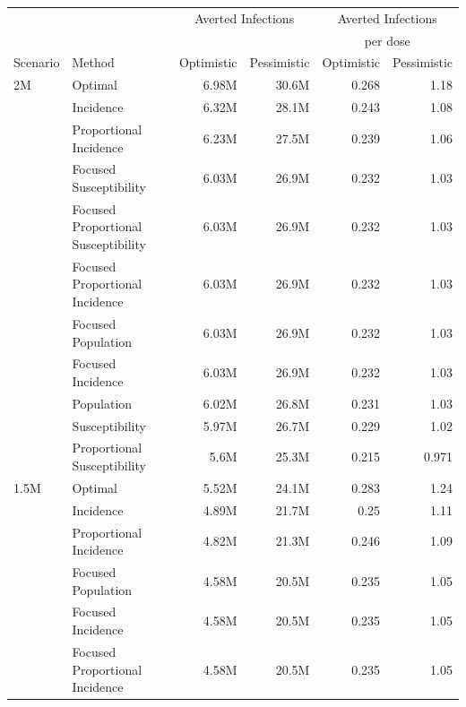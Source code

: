 \begin{table}[h!]
\centering
\tiny
\begin{tabular}{llrrrr}
\toprule
& {} & \multicolumn{2}{c}{Averted Infections} & \multicolumn{2}{c}{Averted Infections} \\
&    &  & & \multicolumn{2}{c}{per dose} \\
Scenario & Method &  Optimistic & Pessimistic &     Optimistic & Pessimistic          \\
\midrule
2M & Optimal &   6.98M &    30.6M &          0.268 &        1.18 \\
        & Incidence &   6.32M &    28.1M &          0.243 &        1.08 \\
        & Proportional Incidence &   6.23M &    27.5M &          0.239 &        1.06 \\
        & Focused Susceptibility &   6.03M &    26.9M &          0.232 &        1.03 \\
        & Focused Proportional Susceptibility &   6.03M &    26.9M &          0.232 &        1.03 \\
        & Focused Proportional Incidence &   6.03M &    26.9M &          0.232 &        1.03 \\
        & Focused Population &   6.03M &    26.9M &          0.232 &        1.03 \\
        & Focused Incidence &   6.03M &    26.9M &          0.232 &        1.03 \\
        & Population &   6.02M &    26.8M &          0.231 &        1.03 \\
        & Susceptibility &   5.97M &    26.7M &          0.229 &        1.02 \\
        & Proportional Susceptibility &    5.6M &    25.3M &          0.215 &       0.971 \\
1.5M & Optimal &   5.52M &    24.1M &          0.283 &        1.24 \\
        & Incidence &   4.89M &    21.7M &           0.25 &        1.11 \\
        & Proportional Incidence &   4.82M &    21.3M &          0.246 &        1.09 \\
        & Focused Population &   4.58M &    20.5M &          0.235 &        1.05 \\
        & Focused Incidence &   4.58M &    20.5M &          0.235 &        1.05 \\
        & Focused Proportional Incidence &   4.58M &    20.5M &          0.235 &        1.05 \\

\end{tabular}
\end{table}

